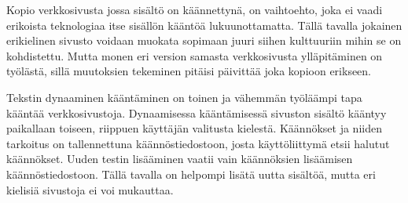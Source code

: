 \documentclass[11pt,a4paper,titlepage,oneside]{article}
\begin{document}
%








Kopio verkkosivusta jossa sisältö on käännettynä, on vaihtoehto, joka ei vaadi erikoista teknologiaa itse sisällön kääntöä lukuunottamatta.
Tällä tavalla jokainen erikielinen sivusto voidaan muokata sopimaan juuri siihen kulttuuriin mihin se on kohdistettu.
Mutta monen eri version samasta verkkosivusta ylläpitäminen on työlästä, sillä muutoksien tekeminen pitäisi päivittää joka kopioon erikseen.
\medskip







Tekstin dynaaminen kääntäminen on toinen ja vähemmän työläämpi tapa kääntää verkkosivustoja.
Dynaamisessa kääntämisessä sivuston sisältö kääntyy paikallaan toiseen, riippuen käyttäjän valitusta kielestä.
Käännökset ja niiden tarkoitus on tallennettuna käännöstiedostoon, 
josta käyttöliittymä etsii halutut käännökset.\citemissing
Uuden testin lisääminen vaatii vain käännöksien lisäämisen käännöstiedostoon.
Tällä tavalla on helpompi lisätä uutta sisältöä, mutta eri kielisiä sivustoja ei voi mukauttaa.
\medskip
\end{document}
